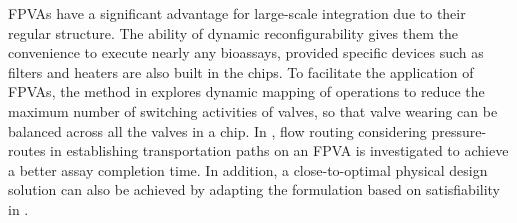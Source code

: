 FPVAs have a significant advantage for large-scale integration
due to their regular structure.
The ability of dynamic reconfigurability gives
them the convenience to execute nearly any bioassays, provided specific devices
such as filters and heaters are also built in the chips. 
%
%
To facilitate the application of FPVAs, 
the method in \cite{TsengLHS15,TBMTtcad} explores
dynamic mapping of operations to reduce the
maximum number of switching activities of valves, so that valve wearing can be balanced
across all the valves in a chip.
In \cite{pump}, flow routing considering
pressure-routes in establishing transportation paths on an FPVA is investigated
to achieve a better assay completion time. In addition, a
close-to-optimal physical design solution can also be achieved by adapting the
formulation based on satisfiability in \cite{grimmer2017close}.



